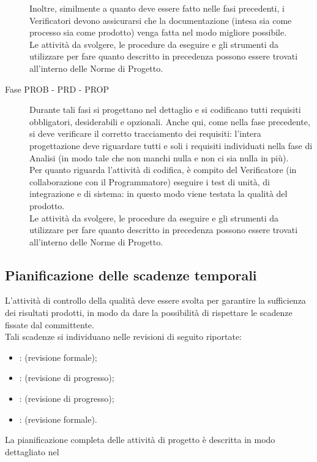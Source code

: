 \begin{description}
			Inoltre, similmente a quanto deve essere fatto nelle fasi precedenti, i Verificatori devono assicurarsi che la documentazione (intesa sia 
			come processo sia come prodotto) venga fatta nel modo migliore possibile.\\
			Le attività da svolgere, le procedure da eseguire e gli strumenti da utilizzare per fare quanto descritto in precedenza possono essere trovati 
			all'interno delle Norme di Progetto.
			\item[Fase PROB - PRD - PROP] Durante tali fasi si progettano nel dettaglio e si codificano tutti requisiti obbligatori, desiderabili e 
			opzionali. Anche qui, come nella fase precedente, si deve verificare il corretto tracciamento dei requisiti: l'intera progettazione deve 
			riguardare tutti e soli i requisiti individuati nella fase di Analisi (in modo tale che non manchi nulla e non ci sia nulla in più).\\
			Per quanto riguarda l'attività di codifica, è compito del Verificatore (in collaborazione con il Programmatore) eseguire i test di unità, di 
			integrazione e di sistema: in questo modo viene testata la qualità del prodotto.\\
			Le attività da svolgere, le procedure da eseguire e gli strumenti da utilizzare per fare quanto descritto in precedenza possono essere trovati 
			all'interno delle Norme di Progetto.
		\end{description}
		\subsection{Pianificazione delle scadenze temporali}
			L'attività di controllo della qualità deve essere svolta per garantire la sufficienza dei risultati prodotti, in modo da dare la possibilità di rispettare le scadenze fissate dal committente.\\
			Tali scadenze si individuano nelle revisioni di seguito riportate:
			\begin{itemize}
				\item {}:  (revisione formale);
				\item {}:  (revisione di progresso);
				\item {}:  (revisione di progresso);
				\item {}:  (revisione formale).
			\end{itemize}
			La pianificazione completa delle attività di progetto è descritta in modo dettagliato nel 
